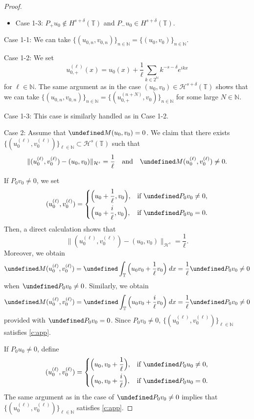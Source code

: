 \documentclass[%
11pt,  reqno]{amsart}
\newcommand{\T}{\mathbb{T}}
\newcommand{\N}{\mathbb{N}}
\renewcommand{\H}{\mathcal H}
\newcommand{\dl}{\delta}
\renewcommand{\l}{\ell}
\numberwithin{equation}{section}
\numberwithin{theorem}{section}
\let\Re=\undefined\DeclareMathOperator*{\Re}{Re}
\let\Im=\undefined\DeclareMathOperator*{\Im}{Im}
\begin{document}
\begin{proof}
\begin{itemize}
\item
Case 1-3:
$P_+ u_0 \notin H^{s+\dl}(\T)$ and $P_- u_0 \in H^{s+\dl}(\T)$.
\end{itemize}

Case 1-1:
We can take $\{(u_{0,n}, v_{0,n})\}_{n \in \N} = \{(u_{0}, v_0)\}_{n \in \N}$.

Case 1-2:
We set
\[
u_{0, +}^{(\l)} (x) = u_0(x) + \frac 1\l \sum_{k \in 2^\N} k^{-s-\dl} e^{i k x}
\]
for $\l \in \N$.
The same argument as in the case $(u_0, v_0) \in \H^{s+\dl}(\T)$  shows that
we can take
$\{(u_{0,n}, v_{0,n})\}_{n \in \N} = \{(u_{0,+}^{(n+N)}, v_0)\}_{n \in \N}$ for some large $N \in \N$.

Case 1-3:
This case is similarly handled as in Case 1-2.

Case 2: Assume that $\Im M (u_0, v_0) = 0$.
We claim that there exists $\{(u_{0}^{(\l)}, v_{0}^{(\l)} ) \}_{\l \in \N} \subset \H^s(\T)$ such that
\begin{equation}
\| (u_0^{(\l)}, v_0^{(\l)}) - (u_{0}, v_{0}) \|_{\H^s} = \frac 1\l 
\quad \text {and} \quad \Im M (u_{0}^{(\l)}, v_{0}^{(\l)}) \neq 0.
\label{c:app}
\end{equation}

If $P_0 v_0 \neq 0$, we set
\[
(u_0^{(\l)}, v_0^{(\l)}) =
\left\{
\begin{aligned}
&\Big( u_0 + \frac 1\l, v_0 \Big), && \text {if $\Im P_0 v_0 \neq 0$}, \\
&\Big( u_0 + \frac i\l, v_0 \Big), && \text {if $\Im P_0 v_0 = 0$}.
\end{aligned}
\right.
\] 
Then, a direct calculation shows that
\[
\| (u_0^{(\l)}, v_0^{(\l)}) - (u_0 , v_0) \|_{\H^s} 
= \frac 1\l.
\]
Moreover, we obtain
\begin{equation*}
\Im M (u_0^{(\l)}, v_0^{(\l)})
=
\Im \int_\T \Big(u_0 v_0 + \frac 1\l v_0 \Big) \; dx 
= 
\frac 1\l \Im P_0 v_0
\neq 0
\end{equation*}
when $\Im P_0 v_0 \neq 0$.
Similarly, we obtain
\[
\Im M (u_0^{(\l)}, v_0^{(\l)})
=
\Im \int_\T \Big( u_0 v_0 + \frac i\l v_0 \Big) \; dx 
= 
\frac 1\l \Re P_0 v_0
\neq 0
\]
provided with $\Im P_0 v_0 = 0$.
Since $P_0 v_0 \neq 0$,
$\{(u_0^{(\l)}, v_0^{(\l)})\}_{\l \in \N}$ satisfies \eqref{c:app}.


If $P_0 u_0 \neq 0$, define
\[
(u_0^{(\l)}, v_0^{(\l)}) =
\left\{
\begin{aligned}
&\Big( u_0, v_0 + \frac 1\l \Big), && \text {if $\Im P_0 u_0 \neq 0$}, \\
&\Big( u_0, v_0 + \frac i\l \Big), && \text {if $\Im P_0 u_0 = 0$}.
\end{aligned}
\right.
\] 
The same argument as in the case of $\Im P_0 v_0 \neq 0$ implies that
$\{(u_0^{(\l)}, v_0^{(\l)})\}_{\l \in \N}$ satisfies \eqref{c:app}.


\end{proof}
\end{document}
